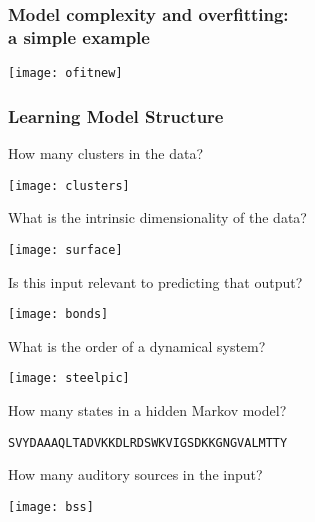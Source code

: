 

\newcommand{\by}{\mathbf{y}}
\newcommand{\bx}{\mathbf{x}}
\newcommand{\yy}{\mathbf{y}}
\newcommand{\im}{\item}
\newlength{\oin}
\setlength{\oin}{0.45in}
\newcommand{\cF}{\mathcal{F}}
\newcommand{\nn}{\nonumber}
\newcommand{\bw}{\mathbf{w}}
\newcommand{\bv}{\mathbf{v}}






\begin{frame}
\frametitle{Model complexity and overfitting: \\ a simple example}

\vspace{0.5\oin}
\centerline{\texttt{[image: ofitnew]}}
\vspace{0.3\oin}

\end{frame}
\begin{frame}
\frametitle{Learning Model Structure}

\vspace*{-5ex}
How many clusters in the data? \hfill \parbox{1.5\oin}{\texttt{[image: clusters]}}

\vspace*{-2.5ex}
What is the intrinsic dimensionality of the data? \hfill \parbox{1.5\oin}{\texttt{[image: surface]}}

Is this input relevant to predicting that output?
\hfill \parbox{1.5\oin}{\texttt{[image: bonds]}} 

\vspace*{-2.5ex}
What is the order of a dynamical system?
\hfill \parbox{1.5\oin}{\texttt{[image: steelpic]}}

How many states in a hidden Markov model? 

\vspace*{-2.5ex}
\phantom{.} \hfill {\small \tt SVYDAAAQLTADVKKDLRDSWKVIGSDKKGNGVALMTTY}

\vspace*{-2.5ex}
How many auditory sources in the input? \hfill
\parbox{1.5\oin}{\texttt{[image: bss]}}


\end{frame}
